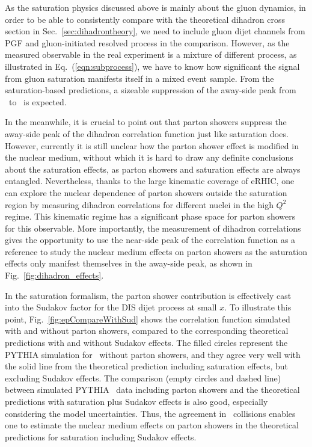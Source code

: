 As the saturation physics discussed above is mainly about the gluon dynamics, in
order to be able to consistently compare with the theoretical dihadron cross
section in Sec.~\ref{sec:dihadrontheory}, we need to include gluon dijet channels from
PGF and gluon-initiated resolved process in the comparison. However, as the
measured observable in the real experiment is a mixture of different process, as
illustrated in Eq.~(\ref{eqn:subprocess}), we have to know how significant the
signal from gluon saturation manifests itself in a mixed event sample. From the
saturation-based predictions, a sizeable suppression of the away-side peak from \ep\
to \eA\ is expected.

In the meanwhile, it is crucial to point out that parton showers suppress the
away-side peak of the dihadron correlation function just like saturation does.
However, currently it is still unclear how the parton shower effect is modified
in the nuclear medium, without which it is hard to draw any definite conclusions
about the saturation effects, as parton showers and saturation effects are always
entangled. Nevertheless, thanks to the large kinematic coverage of eRHIC, one
can explore the nuclear dependence of parton showers outside the saturation
region by measuring dihadron correlations for different nuclei in the high
$Q^2$ regime. This kinematic regime has a significant phase space for parton
showers for this observable. More importantly, the measurement of dihadron
correlations gives the opportunity to use the near-side peak of the correlation
function as a reference to study the nuclear medium effects on parton showers as
the saturation effects only manifest themselves in the away-side peak, as shown
in Fig.~\ref{fig:dihadron_effects}.

In the saturation formalism, the parton shower contribution is effectively cast
into the Sudakov factor for the DIS dijet process at small $x$. To illustrate this
point, Fig.~\ref{fig:epCompareWithSud} shows the correlation function simulated
with and without parton showers, compared to the corresponding theoretical
predictions with and without Sudakov effects. The filled circles represent the PYTHIA
simulation for \ep\ without parton showers, and they agree very well with the solid
line from the theoretical prediction including saturation effects, but excluding
Sudakov effects. The comparison (empty circles and dashed line) between simulated PYTHIA \ep\
data including parton showers and the theoretical predictions with
saturation plus Sudakov effects is also good, especially considering the model
uncertainties. Thus, the agreement in \ep\ collisions enables one to estimate the
nuclear medium effects on parton showers in the theoretical predictions for
saturation including Sudakov effects.

